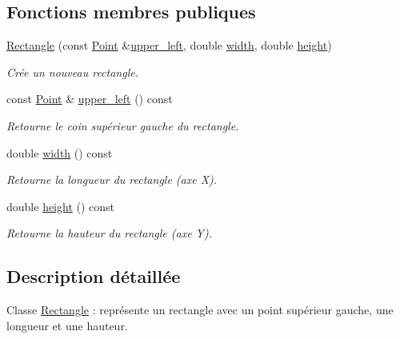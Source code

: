 \subsection*{Fonctions membres publiques}
\begin{DoxyCompactItemize}
\item 
\hyperlink{classRectangle_a782e2380748066e1fd339a5a44e9eb13}{Rectangle} (const \hyperlink{classPoint}{Point} \&\hyperlink{classRectangle_aa8daaedf1bf1de9b84d81c8b09c0ee53}{upper\+\_\+left}, double \hyperlink{classRectangle_af1c00b4fce87c93d883d1038b22fdbbf}{width}, double \hyperlink{classRectangle_a5ac391528a35b90ae1bb3c2ccd059df1}{height})
\begin{DoxyCompactList}\small\item\em Crée un nouveau rectangle. \end{DoxyCompactList}\item 
const \hyperlink{classPoint}{Point} \& \hyperlink{classRectangle_aa8daaedf1bf1de9b84d81c8b09c0ee53}{upper\+\_\+left} () const 
\begin{DoxyCompactList}\small\item\em Retourne le coin supérieur gauche du rectangle. \end{DoxyCompactList}\item 
double \hyperlink{classRectangle_af1c00b4fce87c93d883d1038b22fdbbf}{width} () const 
\begin{DoxyCompactList}\small\item\em Retourne la longueur du rectangle (axe X). \end{DoxyCompactList}\item 
double \hyperlink{classRectangle_a5ac391528a35b90ae1bb3c2ccd059df1}{height} () const 
\begin{DoxyCompactList}\small\item\em Retourne la hauteur du rectangle (axe Y). \end{DoxyCompactList}\end{DoxyCompactItemize}


\subsection{Description détaillée}
Classe \hyperlink{classRectangle}{Rectangle} \+: représente un rectangle avec un point supérieur gauche, une longueur et une hauteur. 

